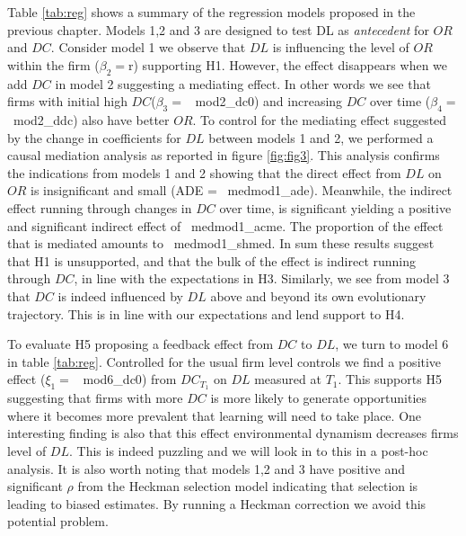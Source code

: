 \documentclass[review,fleqn]{elsarticle}\usepackage[]{graphicx}\usepackage[]{color}
\begin{document}
Table \ref{tab:reg} shows a summary of the regression models proposed in the previous
chapter. Models 1,2 and 3 are designed to test DL as \emph{antecedent} for $OR$ and
$DC$. Consider model 1 we observe that $DL$ is influencing the level of $OR$ within the
firm ($\beta_2 =$r) supporting H1. However, the effect disappears when we
add $DC$ in model 2 suggesting a mediating effect. In other words we see that firms with
initial high $DC$($\beta_3=$ \ {mod2_dc0}) and increasing $DC$ over time ($\beta_4=$
\ {mod2_ddc}) also have better $OR$. To control for the mediating effect suggested by
the change in coefficients for $DL$ between models 1 and 2, we performed a causal
mediation analysis as reported in figure \ref{fig:fig3}. This analysis confirms the
indications from models 1 and 2 showing that the direct effect from $DL$ on $OR$ is
insignificant and small (ADE = \ {medmod1_ade}). Meanwhile, the indirect effect
running through changes in $DC$ over time, is significant yielding a positive and
significant indirect effect of \ {medmod1_acme}. The proportion of the effect that is
mediated amounts to \ {medmod1_shmed}. In sum these results suggest that H1 is
unsupported, and that the bulk of the effect is indirect running through $DC$, in line with
the expectations in H3. Similarly, we see from model 3 that $DC$ is indeed influenced by $DL$
above and beyond its own evolutionary trajectory. This is in line with our expectations
and lend support to H4.

To evaluate H5 proposing a feedback effect from $DC$ to $DL$, we turn to model 6 in table
\ref{tab:reg}. Controlled for the usual firm level controls we find a positive effect
($\xi_1=$ \ {mod6_dc0}) from $DC_{T_1}$ on $DL$ measured at $T_1$. This supports H5
suggesting that firms with more $DC$ is more likely to generate opportunities where it
becomes more prevalent that learning will need to take place. One interesting finding is
also that this effect environmental dynamism decreases firms level of $DL$. This is indeed
puzzling and we will look in to this in a post-hoc analysis. It is also worth noting that models 1,2 and 3 have positive
and significant $\rho$ from the Heckman selection model indicating that selection is
leading to biased estimates. By running a Heckman correction we avoid this potential
problem.
\end{document}
